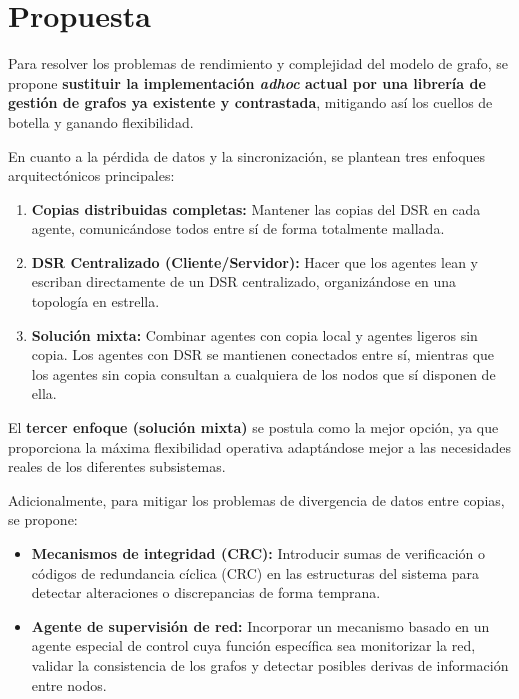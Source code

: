 \documentclass{article}
\begin{document}
\section{Propuesta}\label{sec:proposition}

Para resolver los problemas de rendimiento y complejidad del modelo de grafo,
se propone \textbf{sustituir la implementación \textit{adhoc} actual por una
        librería de gestión de grafos ya existente y contrastada}, mitigando así los
cuellos de botella y ganando flexibilidad.

En cuanto a la pérdida de datos y la sincronización, se plantean tres enfoques
arquitectónicos principales:
\begin{enumerate}
        \item \textbf{Copias distribuidas completas:} Mantener las copias del
              DSR en cada agente, comunicándose todos entre sí de forma
              totalmente mallada.
        \item \textbf{DSR Centralizado (Cliente/Servidor):} Hacer que los
              agentes lean y escriban directamente de un DSR centralizado,
              organizándose en una topología en estrella.
        \item \textbf{Solución mixta:} Combinar agentes con copia local y
              agentes ligeros sin copia. Los agentes con DSR se mantienen
              conectados entre sí, mientras que los agentes sin copia consultan
              a cualquiera de los nodos que sí disponen de ella.
\end{enumerate}

El \textbf{tercer enfoque (solución mixta)} se postula como la mejor opción, ya
que proporciona la máxima flexibilidad operativa adaptándose mejor a las
necesidades reales de los diferentes subsistemas.

Adicionalmente, para mitigar los problemas de divergencia de datos entre
copias, se propone:
\begin{itemize}
        \item \textbf{Mecanismos de integridad (CRC):} Introducir sumas de
              verificación o códigos de redundancia cíclica (CRC) en las
              estructuras del sistema para detectar alteraciones o
              discrepancias de forma temprana.
        \item \textbf{Agente de supervisión de red:} Incorporar un mecanismo
              basado en un agente especial de control cuya función específica
              sea monitorizar la red, validar la consistencia de los grafos y
              detectar posibles derivas de información entre nodos.
\end{itemize}
\end{document}
